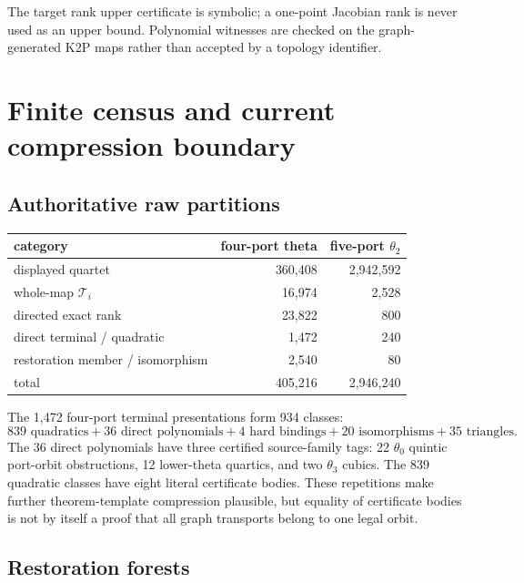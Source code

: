 \documentclass[11pt]{article}
\theoremstyle{remark}
\newcommand{\Ti}{\mathcal T_i}
\begin{document}
The target rank upper certificate is symbolic; a one-point Jacobian rank is
never used as an upper bound.  Polynomial witnesses are checked on the graph-
generated K2P maps rather than accepted by a topology identifier.

\section{Finite census and current compression boundary}\label{sec:census}

\subsection{Authoritative raw partitions}

\begin{center}
\begin{tabular}{lrr}
\toprule
category & four-port theta & five-port \(\theta_2\)\\
\midrule
displayed quartet & 360,408 & 2,942,592\\
whole-map \(\Ti\) & 16,974 & 2,528\\
directed exact rank & 23,822 & 800\\
direct terminal / quadratic & 1,472 & 240\\
restoration member / isomorphism & 2,540 & 80\\
\midrule
total & 405,216 & 2,946,240\\
\bottomrule
\end{tabular}
\end{center}

The 1,472 four-port terminal presentations form 934 classes:
\[
839\text{ quadratics}+36\text{ direct polynomials}+4\text{ hard bindings}
+20\text{ isomorphisms}+35\text{ triangles}.
\]
The 36 direct polynomials have three certified source-family tags:
22 \(\theta_0\) quintic port-orbit obstructions, 12 lower-theta quartics,
and two \(\theta_3\) cubics.  The 839 quadratic classes have eight literal
certificate bodies.  These repetitions make further theorem-template
compression plausible, but equality of certificate bodies is not by itself a
proof that all graph transports belong to one legal orbit.



\subsection{Restoration forests}
\end{document}
